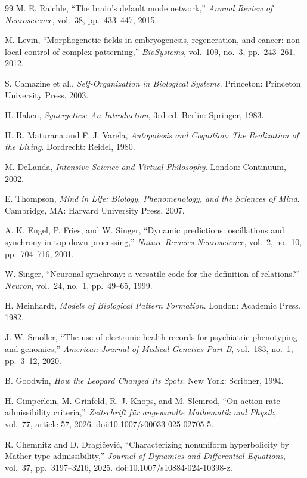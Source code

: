 \documentclass[11pt,a4paper]{article}
\theoremstyle{plain}
\theoremstyle{definition}
\begin{document}
\begin{thebibliography}{99}
M. E. Raichle,
``The brain's default mode network,''
\textit{Annual Review of Neuroscience},
vol.\ 38, pp.\ 433--447, 2015.

M. Levin,
``Morphogenetic fields in embryogenesis, regeneration, and cancer:
non-local control of complex patterning,''
\textit{BioSystems},
vol.\ 109, no.\ 3, pp.\ 243--261, 2012.

S. Camazine et al.,
\textit{Self-Organization in Biological Systems}.
Princeton: Princeton University Press, 2003.

H. Haken,
\textit{Synergetics: An Introduction},
3rd ed.
Berlin: Springer, 1983.

H. R. Maturana and F. J. Varela,
\textit{Autopoiesis and Cognition: The Realization of the Living}.
Dordrecht: Reidel, 1980.

M. DeLanda,
\textit{Intensive Science and Virtual Philosophy}.
London: Continuum, 2002.

E. Thompson,
\textit{Mind in Life: Biology, Phenomenology, and the Sciences of Mind}.
Cambridge, MA: Harvard University Press, 2007.

A. K. Engel, P. Fries, and W. Singer,
``Dynamic predictions: oscillations and synchrony in top-down processing,''
\textit{Nature Reviews Neuroscience},
vol.\ 2, no.\ 10, pp.\ 704--716, 2001.

W. Singer,
``Neuronal synchrony: a versatile code for the definition of relations?''
\textit{Neuron},
vol.\ 24, no.\ 1, pp.\ 49--65, 1999.

H. Meinhardt,
\textit{Models of Biological Pattern Formation}.
London: Academic Press, 1982.

J. W. Smoller,
``The use of electronic health records for psychiatric phenotyping and genomics,''
\textit{American Journal of Medical Genetics Part B},
vol.\ 183, no.\ 1, pp.\ 3--12, 2020.

B. Goodwin,
\textit{How the Leopard Changed Its Spots}.
New York: Scribner, 1994.

H. Gimperlein, M. Grinfeld, R. J. Knops, and M. Slemrod,
``On action rate admissibility criteria,''
\textit{Zeitschrift f\"ur angewandte Mathematik und Physik},
vol.\ 77, article 57, 2026.
doi:10.1007/s00033-025-02705-5.

R. Chemnitz and D. Dragi\v{c}evi\'c,
``Characterizing nonuniform hyperbolicity by Mather-type admissibility,''
\textit{Journal of Dynamics and Differential Equations},
vol.\ 37, pp.\ 3197--3216, 2025.
doi:10.1007/s10884-024-10398-z.


\end{thebibliography}
\end{document}
